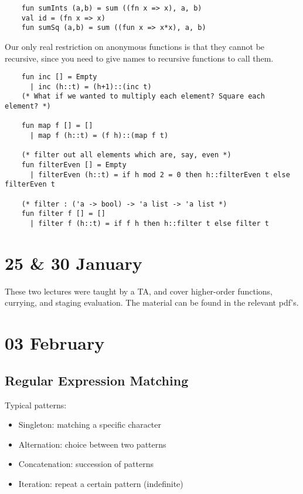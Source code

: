 \documentclass[11pt]{article}
\begin{document}
\begin{verbatim}
    fun sumInts (a,b) = sum ((fn x => x), a, b)
    val id = (fn x => x)
    fun sumSq (a,b) = sum ((fun x => x*x), a, b)
\end{verbatim}

Our only real restriction on anonymous functions is that they cannot be recursive, since you need to give names to recursive functions to call them.

\begin{verbatim}
    fun inc [] = Empty
      | inc (h::t) = (h+1)::(inc t)
    (* What if we wanted to multiply each element? Square each element? *)
    
    fun map f [] = []
      | map f (h::t) = (f h)::(map f t)
    
    (* filter out all elements which are, say, even *)
    fun filterEven [] = Empty
      | filterEven (h::t) = if h mod 2 = 0 then h::filterEven t else filterEven t
    
    (* filter : ('a -> bool) -> 'a list -> 'a list *)
    fun filter f [] = []
      | filter f (h::t) = if f h then h::filter t else filter t
\end{verbatim}

\section{25 \& 30 January} %
These two lectures were taught by a TA, and cover higher-order functions, currying, and staging evaluation. The material can be found in the relevant pdf's.


\pagebreak
\section{03 February}
\subsection{Regular Expression Matching}

Typical patterns:
\begin{itemize}
    \item Singleton: matching a specific character
    \item Alternation: choice between two patterns
    \item Concatenation: succession of patterns
    \item Iteration: repeat a certain pattern (indefinite)
\end{itemize}
\end{document}
